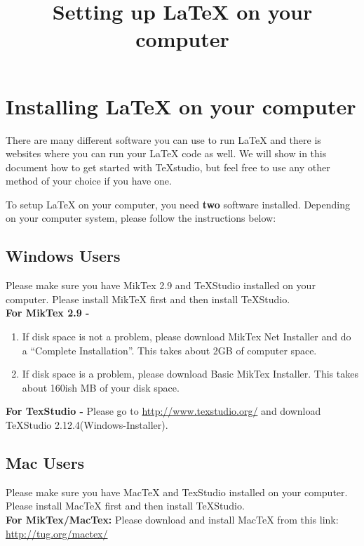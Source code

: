 \documentclass[]{article}
\title{Setting up {\LaTeX} on your computer}
\begin{document}
\maketitle
\section*{Installing {\LaTeX} on your computer}
There are many different software you can use to run {\LaTeX} and there is websites where you can run your {\LaTeX} code as well. We will show in this document how to get started with TeXstudio, but feel free to use any other method of your choice if you have one.

To setup {\LaTeX} on your computer, you need \textbf{two} software installed. Depending on your computer system, please follow the instructions below:

\subsection*{Windows Users}
Please make sure you have MikTex 2.9 and TeXStudio installed on your computer. Please install MikTeX first and then install TeXStudio. \\

\textbf{For MikTex 2.9 -}
\begin{enumerate}
\item If disk space is not a problem, please download MikTex Net Installer and do a ``Complete Installation''. This takes about 2GB of computer space. 

\item If disk space is a problem, please download Basic MikTex Installer. This takes about 160ish MB of your disk space. 
\end{enumerate}

\textbf{For TexStudio -  }
Please go to \url{http://www.texstudio.org/} and download TeXStudio 2.12.4(Windows-Installer). 

\subsection*{Mac Users}
Please make sure you have MacTeX and TexStudio installed on your computer. Please install MacTeX first and then install TeXStudio.  \\

\textbf{For MikTex/MacTex:}
Please download and install MacTeX from this link: \url{http://tug.org/mactex/} \\
\end{document}
